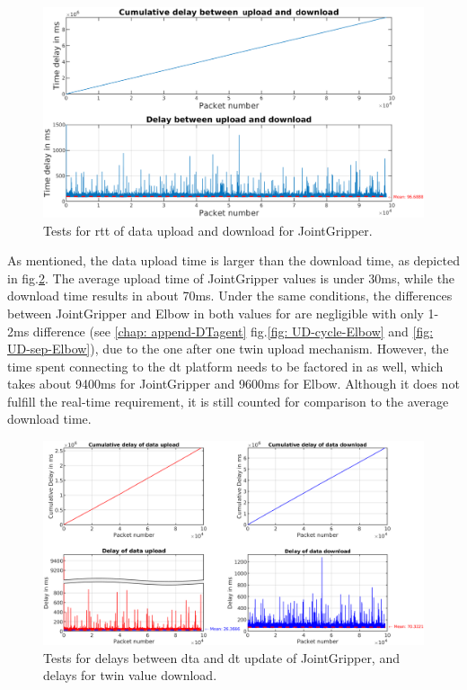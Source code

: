 \begin{figure}[htb]
    \includegraphics[width=\textwidth]{figures/tests/DT/Delay_UploadDownloadCycleTime_JointGripper.pdf}
    \centering
    \caption{Tests for \gls{rtt} of data upload and download for JointGripper. \label{fig: UD-cycle-JointGripper}}
\end{figure}

As mentioned, the data upload time is larger than the download time, as depicted in 
fig.\ref{fig: UD-sep-JointGripper}. The average upload time of JointGripper values is under 30ms, 
while the download time results in about 70ms. Under the same conditions, the differences 
between JointGripper and Elbow in both values for are negligible with only 1-2ms difference (see \ref{chap: append-DTagent} fig.\ref{fig: UD-cycle-Elbow} 
and \ref{fig: UD-sep-Elbow}), due to the one after one twin upload mechanism. However, 
the time spent connecting to the \gls{dt} platform needs to be factored in 
as well, which takes about 9400ms for JointGripper and 9600ms for Elbow. Although it 
does not fulfill the real-time requirement, it is still counted for comparison 
to the average download time.




\begin{figure}[htb]
    \includegraphics[width=\textwidth]{figures/tests/DT/Delay_UploadDownload_JointGripper.png}
    \centering
    \caption{Tests for delays between \gls{dta} and \gls{dt} update of JointGripper, 
    and delays for twin value download. \label{fig: UD-sep-JointGripper}}
\end{figure}


